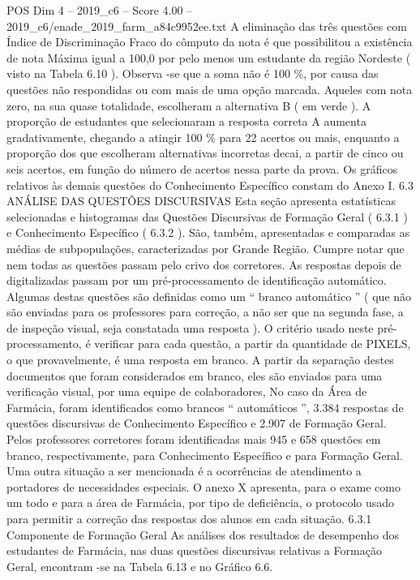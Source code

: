 \begin{textsample}{POS Dim 4 – 2019\_c6 – Score 4.00 – 2019\_c6/enade\_2019\_farm\_a84c9952ee.txt}
A eliminação das três questões com Índice de Discriminação Fraco do cômputo da nota é que possibilitou a existência de nota Máxima igual a 100,0 por pelo menos um estudante da região Nordeste ( visto na Tabela 6.10 ).
Observa -se que a soma não é 100 \%, por causa das questões não respondidas ou com mais de uma opção marcada.
Aqueles com nota zero, na sua quase totalidade, escolheram a alternativa B ( em verde ).
A proporção de estudantes que selecionaram a resposta correta A aumenta gradativamente, chegando a atingir 100 \% para 22 acertos ou mais, enquanto a proporção dos que escolheram alternativas incorretas decai, a partir de cinco ou seis acertos, em função do número de acertos nessa parte da prova.
Os gráficos relativos às demais questões do Conhecimento Específico constam do Anexo I. 6.3 ANÁLISE DAS QUESTÕES DISCURSIVAS Esta seção apresenta estatísticas selecionadas e histogramas das Questões Discursivas de Formação Geral ( 6.3.1 ) e Conhecimento Específico ( 6.3.2 ).
São, também, apresentadas e comparadas as médias de subpopulações, caracterizadas por Grande Região.
Cumpre notar que nem todas as questões passam pelo crivo dos corretores.
As respostas depois de digitalizadas passam por um pré-processamento de identificação automático.
Algumas destas questões são definidas como um “ branco automático ” ( que não são enviadas para os professores para correção, a não ser que na segunda fase, a de inspeção visual, seja constatada uma resposta ).
O critério usado neste pré-processamento, é verificar para cada questão, a partir da quantidade de PIXELS, o que provavelmente, é uma resposta em branco.
A partir da separação destes documentos que foram considerados em branco, eles são enviados para uma verificação visual, por uma equipe de colaboradores, No caso da Área de Farmácia, foram identificados como brancos “ automáticos ”, 3.384 respostas de questões discursivas de Conhecimento Específico e 2.907 de Formação Geral.
Pelos professores corretores foram identificadas mais 945 e 658 questões em branco, respectivamente, para Conhecimento Específico e para Formação Geral.
Uma outra situação a ser mencionada é a ocorrências de atendimento a portadores de necessidades especiais.
O anexo X apresenta, para o exame como um todo e para a área de Farmácia, por tipo de deficiência, o protocolo usado para permitir a correção das respostas dos alunos em cada situação. 6.3.1 Componente de Formação Geral As análises dos resultados de desempenho dos estudantes de Farmácia, nas duas questões discursivas relativas a Formação Geral, encontram -se na Tabela 6.13 e no Gráfico 6.6.

\end{textsample}
